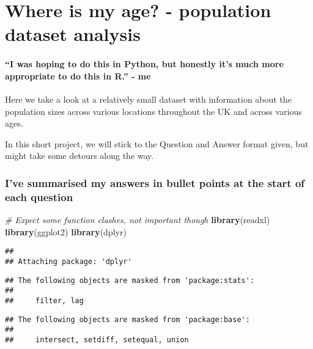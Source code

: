 \documentclass[]{article}
\title{}
\author{Hitesh Kumar}
\date{3 November 2018}
\newenvironment{Shaded}{\begin{snugshade}}{\end{snugshade}}
\newcommand{\KeywordTok}[1]{\textcolor[rgb]{0.13,0.29,0.53}{\textbf{#1}}}
\newcommand{\CommentTok}[1]{\textcolor[rgb]{0.56,0.35,0.01}{\textit{#1}}}
\newcommand{\NormalTok}[1]{#1}
\let\oldparagraph\paragraph
\renewcommand{\paragraph}[1]{\oldparagraph{#1}\mbox{}}
\begin{document}
\section{Where is my age? - population dataset
analysis}\label{where-is-my-age---population-dataset-analysis}

\paragraph{\texorpdfstring{``I was hoping to do this in Python, but
honestly it's much more appropriate to do this in R.'' -
me}{I was hoping to do this in Python, but honestly it's much more appropriate to do this in R. - me}}\label{i-was-hoping-to-do-this-in-python-but-honestly-its-much-more-appropriate-to-do-this-in-r.---me}

Here we take a look at a relatively small dataset with information about
the population sizes across various locations throughout the UK and
across various ages.

In this short project, we will stick to the Question and Answer format
given, but might take some detours along the way.

\subsubsection{\texorpdfstring{\textbf{I've summarised my answers in
bullet points at the start of each
question}}{I've summarised my answers in bullet points at the start of each question}}\label{ive-summarised-my-answers-in-bullet-points-at-the-start-of-each-question}

\begin{Shaded}
\begin{Highlighting}[]
\CommentTok{# Expect some function clashes, not important though}
\KeywordTok{library}\NormalTok{(readxl)}
\KeywordTok{library}\NormalTok{(ggplot2)}
\KeywordTok{library}\NormalTok{(dplyr)}
\end{Highlighting}
\end{Shaded}

\begin{verbatim}
## 
## Attaching package: 'dplyr'
\end{verbatim}

\begin{verbatim}
## The following objects are masked from 'package:stats':
## 
##     filter, lag
\end{verbatim}

\begin{verbatim}
## The following objects are masked from 'package:base':
## 
##     intersect, setdiff, setequal, union
\end{verbatim}
\end{document}
